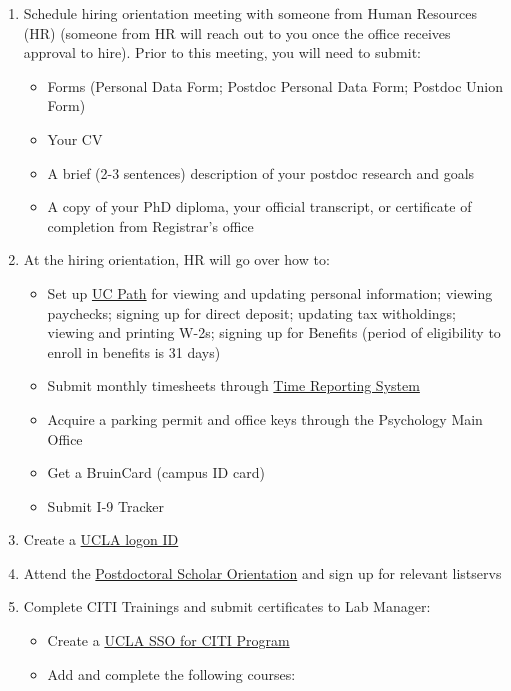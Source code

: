 \documentclass[]{book}
\providecommand{\tightlist}{%
  \setlength{\itemsep}{0pt}\setlength{\parskip}{0pt}}
\begin{document}
\begin{enumerate}
\def\labelenumi{\arabic{enumi}.}
\item
  Schedule hiring orientation meeting with someone from Human Resources (HR) (someone from HR will reach out to you once the office receives approval to hire). Prior to this meeting, you will need to submit:

  \begin{itemize}
  \tightlist
  \item
    Forms (Personal Data Form; Postdoc Personal Data Form; Postdoc Union Form)
  \item
    Your CV
  \item
    A brief (2-3 sentences) description of your postdoc research and goals
  \item
    A copy of your PhD diploma, your official transcript, or certificate of completion from Registrar's office
  \end{itemize}
\item
  At the hiring orientation, HR will go over how to:

  \begin{itemize}
  \tightlist
  \item
    Set up \href{https://ucpath.universityofcalifornia.edu/}{UC Path} for viewing and updating personal information; viewing paychecks; signing up for direct deposit; updating tax witholdings; viewing and printing W-2s; signing up for Benefits (period of eligibility to enroll in benefits is 31 days)
  \item
    Submit monthly timesheets through \href{https://uctrs.it.ucla.edu/}{Time Reporting System}
  \item
    Acquire a parking permit and office keys through the Psychology Main Office
  \item
    Get a BruinCard (campus ID card)
  \item
    Submit I-9 Tracker
  \end{itemize}
\item
  Create a \href{https://accounts.iam.ucla.edu/\#/}{UCLA logon ID}
\item
  Attend the \href{https://www.postdoc.ucla.edu/resources/new-postdocs/}{Postdoctoral Scholar Orientation} and sign up for relevant listservs
\item
  Complete CITI Trainings and submit certificates to Lab Manager:

  \begin{itemize}
  \tightlist
  \item
    Create a \href{http://ora.research.ucla.edu/OHRPP/Documents/Education/SSO_CITI_New_Acct.pdf}{UCLA SSO for CITI Program}
  \item
    Add and complete the following courses:


\end{itemize}
\end{enumerate}
\end{document}
